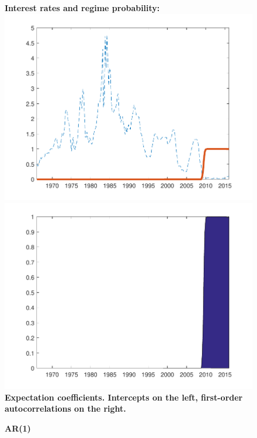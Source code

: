 \documentclass[12pt,reqno]{article}
\numberwithin{equation}{section}
\begin{document}
\begin{figure}[H]
\caption{\large{\textbf{AR(1)}}}
\vspace{5 mm}

\textbf{Interest rates and regime probability:} \\

\includegraphics[scale=0.6]{NKPC_filter_init_AR1_regime.pdf}
\includegraphics[scale=0.6]{NKPC_filter_init_AR1_regimeProb.pdf}\\

\textbf{Expectation coefficients. Intercepts on the left, first-order autocorrelations on the right.}\\


\end{figure}
\end{document}
